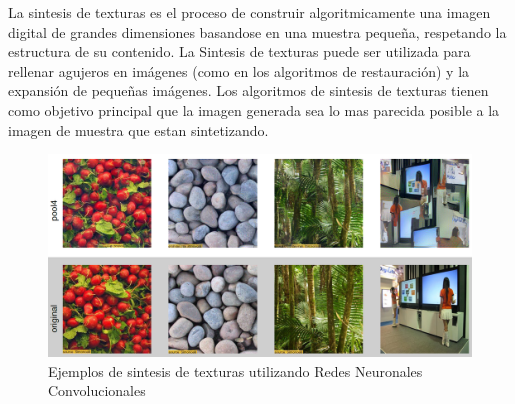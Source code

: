 \documentclass[a4paper,11pt,spanish]{book}
\begin{document}
      La sintesis de texturas es el proceso de construir algoritmicamente una imagen digital de grandes dimensiones basandose en una muestra pequeña, respetando la estructura de su contenido. La Sintesis de
      texturas puede ser utilizada para rellenar agujeros en imágenes (como en los algoritmos de restauración) y la expansión de pequeñas imágenes.
      Los algoritmos de sintesis de texturas tienen como objetivo principal que la imagen generada sea lo mas parecida posible a la imagen de muestra que estan sintetizando.\\
      	\begin{figure}[H]
	  \begin{center}
	   \includegraphics[width=0.8\linewidth]{./img/textures.png}
	  \end{center}
	  \caption{Ejemplos de sintesis de texturas utilizando Redes Neuronales Convolucionales}
	  \label{fig:textures}
	\end{figure}
      
\end{document}

